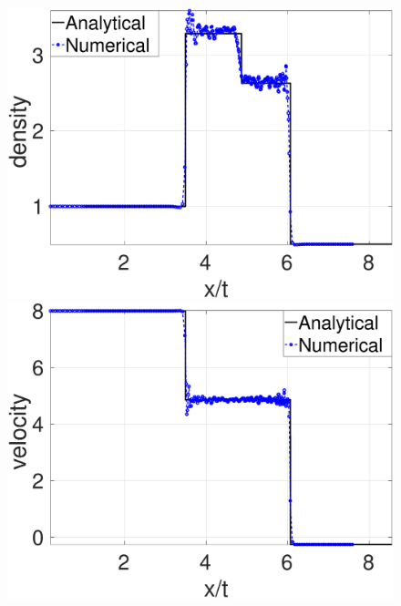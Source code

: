 \begin{figure}
    \begin{minipage}{.495\textwidth}
        \centering
        \includegraphics[width=0.99 \textwidth]{Chapter-4/Figures/double_shock/Dshock-RCM-rho-Rp6}
    \end{minipage}%
    \begin{minipage}{.495 \textwidth}
        \centering
        \includegraphics[width=0.99 \textwidth]{Chapter-4/Figures/double_shock/Dshock-RCM-v-Rp6}
    \end{minipage}%
    \\
    \begin{minipage}{.495\textwidth}
        \centering

\end{minipage}
\end{figure}
